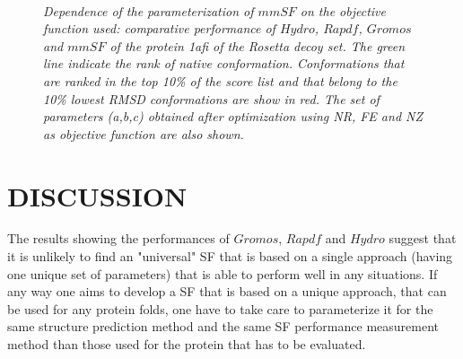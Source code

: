 \documentclass[a4paper,20pt,notitlepage,openbib]{article}
\begin{document}
\begin{figure}
\renewcommand{\thesubfigure}{(\arabic{subfigure})}
\centering
\mbox{\quad
      }
\mbox{\quad
      }
\mbox{\quad
      }
\caption{\label{fig_objective function_1afi}\small\textit{Dependence of the parameterization of $mmSF$ on the objective function used: comparative performance of $Hydro$, $Rapdf$, $Gromos$ and $mmSF$ of the protein 1afi of the Rosetta decoy set. The green line indicate the rank of native conformation. Conformations that are ranked in the top 10\% of the score list and that belong to the 10\% lowest RMSD conformations are show in red. The set of parameters (a,b,c) obtained after optimization using NR, FE and NZ as objective function are also shown.}}
\end{figure}

\section{DISCUSSION}
The results showing the performances of $Gromos$, $Rapdf$ and $Hydro$ suggest that it is unlikely to find an "universal" SF that is based on a single approach  (having one unique set of parameters) that is able to perform well in any situations. If any way one aims to develop a SF that is based on a unique approach, that can be used for any protein folds, one have to take care to parameterize it for the same structure prediction method and the same SF performance measurement method than those used for the protein that has to be evaluated.
\end{document}
